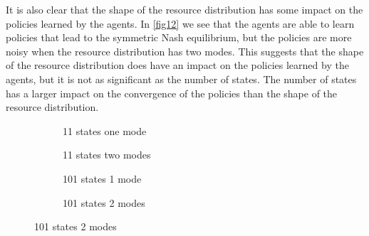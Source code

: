 \documentclass{article}
\begin{document}
                It is also clear that the shape of the resource distribution has some impact on the policies learned by the agents. In \cref{fig12} we see that the agents are able to learn policies that lead to the symmetric Nash equilibrium, but the policies are more noisy when the resource distribution has two modes. This suggests that the shape of the resource distribution does have an impact on the policies learned by the agents, but it is not as significant as the number of states. The number of states has a larger impact on the convergence of the policies than the shape of the resource distribution.
        \clearpage
            \begin{figure}[ht!] 
                        \centering
                        \begin{subfigure}[b]{0.45\linewidth}
                            \centering
                             
                            \caption{11 states one mode} 
                            \label{fig12:a} 
                            \vspace{4ex}
                        \end{subfigure}%
                        \begin{subfigure}[b]{0.45\linewidth}
                            \centering
                             
                            \caption{11 states two modes} 
                            \label{fig12:b} 
                            \vspace{4ex}
                        \end{subfigure} 
                        
                        
                        
                        \begin{subfigure}[b]{0.45\linewidth}
                            \centering
                             
                            \caption{101 states 1 mode}  
                            \label{fig12:c} 
                            \vspace{4ex}
                        \end{subfigure}
                        \begin{subfigure}[b]{0.45\linewidth}
                            \centering
                             
                            \caption{101 states 2 modes} 
                            \label{fig12:d} 
                            \vspace{4ex}
                        \end{subfigure}
    

\end{figure}
\end{document}
